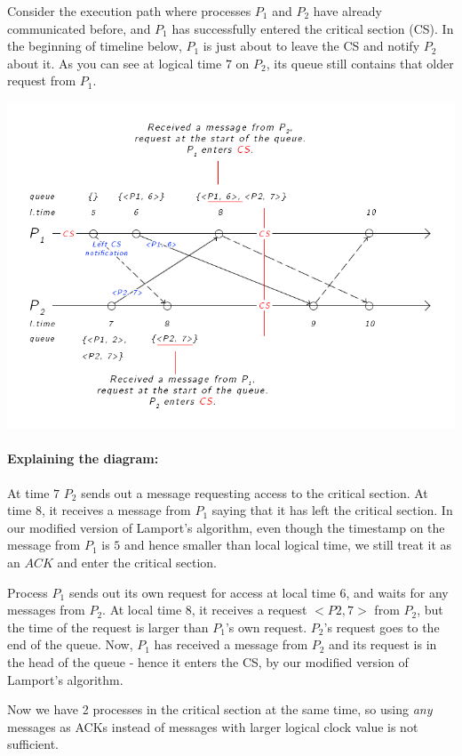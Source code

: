 \documentclass[10pt,letter]{article}
\begin{document}
Consider the execution path where processes $P_1$ and $P_2$ have already communicated before, and $P_1$ has successfully entered the critical section (CS). In the beginning of timeline below, $P_1$ is just about to leave the CS and notify $P_2$ about it. As you can see at logical time $7$ on $P_2$, its queue still contains that older request from $P_1$.

\includegraphics[width=\textwidth,height=\textheight,keepaspectratio]{hw5_problem2}

\paragraph{Explaining the diagram:} At time $7$ $P_2$ sends out a message requesting access to the critical section. At time $8$, it receives a message from $P_1$ saying that it has left the critical section. In our modified version of Lamport's algorithm, even though the timestamp on the message from $P_1$ is $5$ and hence smaller than local logical time, we still treat it as an $ACK$ and enter the critical section.

Process $P_1$ sends out its own request for access at local time $6$, and waits for any messages from $P_2$. At local time $8$, it receives a request $<P2, 7>$ from $P_2$, but the time of the request is larger than $P_1$'s own request. $P_2$'s request goes to the end of the queue. Now, $P_1$ has received a message from $P_2$ and its request is in the head of the queue - hence it enters the CS, by our modified version of Lamport's algorithm.

Now we have 2 processes in the critical section at the same time, so using \textit{any} messages as ACKs instead of messages with larger logical clock value is not sufficient.
\end{document}
